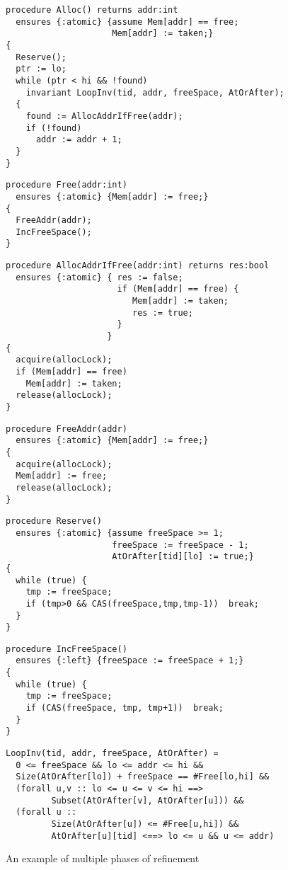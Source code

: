 \begin{figure}
\begin{small}
\begin{verbatim}
procedure Alloc() returns addr:int
  ensures {:atomic} {assume Mem[addr] == free;  
                     Mem[addr] := taken;}
{
  Reserve();         
  ptr := lo;
  while (ptr < hi && !found)
    invariant LoopInv(tid, addr, freeSpace, AtOrAfter);
  { 
    found := AllocAddrIfFree(addr);
    if (!found) 
      addr := addr + 1;
  }
}
\end{verbatim}
\begin{verbatim}
procedure Free(addr:int)
  ensures {:atomic} {Mem[addr] := free;}
{
  FreeAddr(addr);  
  IncFreeSpace(); 
}
\end{verbatim}
\begin{verbatim}
procedure AllocAddrIfFree(addr:int) returns res:bool
  ensures {:atomic} { res := false;
                      if (Mem[addr] == free) {
                         Mem[addr] := taken; 
                         res := true;
                      }  
                    }
{
  acquire(allocLock);
  if (Mem[addr] == free)
    Mem[addr] := taken;   
  release(allocLock);
}
\end{verbatim}
\begin{verbatim}
procedure FreeAddr(addr)
  ensures {:atomic} {Mem[addr] := free;}
{
  acquire(allocLock);
  Mem[addr] := free;   
  release(allocLock);
}
\end{verbatim}
\begin{verbatim}
procedure Reserve() 
  ensures {:atomic} {assume freeSpace >= 1; 
                     freeSpace := freeSpace - 1;
                     AtOrAfter[tid][lo] := true;}
{
  while (true) {
    tmp := freeSpace;
    if (tmp>0 && CAS(freeSpace,tmp,tmp-1))  break;
  }
}
\end{verbatim}
\begin{verbatim}
procedure IncFreeSpace() 
  ensures {:left} {freeSpace := freeSpace + 1;}
{
  while (true) {
    tmp := freeSpace;
    if (CAS(freeSpace, tmp, tmp+1))  break;
  }
}
\end{verbatim}
\begin{verbatim}
LoopInv(tid, addr, freeSpace, AtOrAfter) = 
  0 <= freeSpace && lo <= addr <= hi &&
  Size(AtOrAfter[lo]) + freeSpace == #Free[lo,hi] && 
  (forall u,v :: lo <= u <= v <= hi ==> 
         Subset(AtOrAfter[v], AtOrAfter[u])) &&
  (forall u :: 
         Size(AtOrAfter[u]) <= #Free[u,hi]) &&
         AtOrAfter[u][tid] <==> lo <= u && u <= addr)
\end{verbatim}
\end{small}
\caption{An example of multiple phases of refinement}
\label{fig:refinement}
\end{figure}

